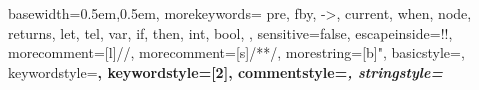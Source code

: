 \newcommand\ocamli[1]{\lstinline[language=mycaml,basicstyle=\ttfamily\normalsize]{#1}}
\newcommand\llvminline[1]{\lstinline[language=LLVM,basicstyle=\ttfamily\normalsize]{#1}}
\newcommand\llvmfile[1]{}



{
  basewidth={0.5em,0.5em},
  morekeywords={
    pre,
    fby,
    ->,
    current,
    when,
    node, 
    returns,
    let,
    tel,
    var,
    if,
    then,
    int,
    bool,
  },
  sensitive=false, %
  escapeinside={!}{!},          %
  morecomment=[l]{//}, %
  morecomment=[s]{/*}{*/}, %
  morestring=[b]", %
  basicstyle=\ttfamily,
  keywordstyle=\bfseries\color{blue!80!black},
  keywordstyle=[2]\bfseries\color{red!50!white},
  commentstyle=\itshape\color{purple!40!black},
  stringstyle=\color{orange}
}
